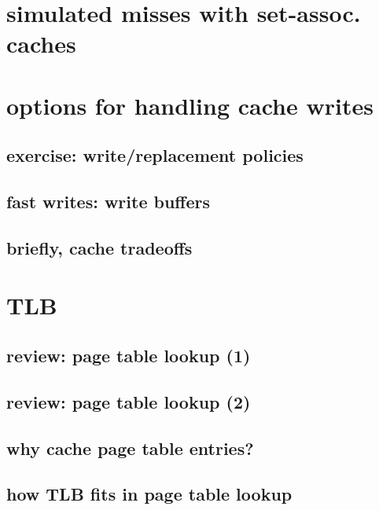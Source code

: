 \section{simulated misses with set-assoc. caches}


\section{options for handling cache writes}


\subsection{exercise: write/replacement policies}


\subsection{fast writes: write buffers}


\subsection{briefly, cache tradeoffs}


\section{TLB}

\subsection{review: page table lookup (1)}


\subsection{review: page table lookup (2)}

\subsection{why cache page table entries?}


\subsection{how TLB fits in page table lookup}


